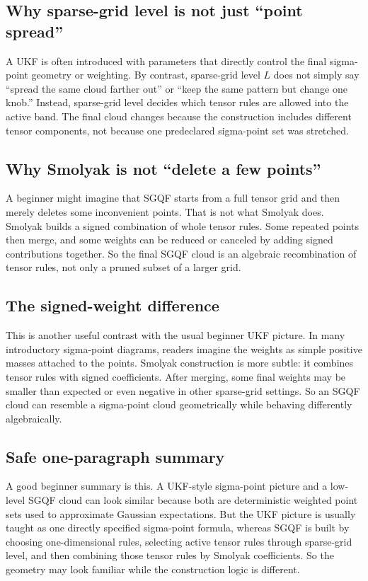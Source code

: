 \documentclass[11pt]{article}
\begin{document}
\subsection{Why sparse-grid level is not just ``point spread''}

A UKF is often introduced with parameters that directly control the final
sigma-point geometry or weighting.  By contrast, sparse-grid level \(L\) does not
simply say ``spread the same cloud farther out'' or ``keep the same pattern but
change one knob.''  Instead, sparse-grid level decides which tensor rules are
allowed into the active band.  The final cloud changes because the construction
includes different tensor components, not because one predeclared sigma-point set
was stretched.

\subsection{Why Smolyak is not ``delete a few points''}

A beginner might imagine that SGQF starts from a full tensor grid and then merely
deletes some inconvenient points.  That is not what Smolyak does.  Smolyak builds
a signed combination of whole tensor rules.  Some repeated points then merge, and
some weights can be reduced or canceled by adding signed contributions together.
So the final SGQF cloud is an algebraic recombination of tensor rules, not only a
pruned subset of a larger grid.

\subsection{The signed-weight difference}

This is another useful contrast with the usual beginner UKF picture.  In many
introductory sigma-point diagrams, readers imagine the weights as simple positive
masses attached to the points.  Smolyak construction is more subtle: it combines
tensor rules with signed coefficients.  After merging, some final weights may be
smaller than expected or even negative in other sparse-grid settings.  So an SGQF
cloud can resemble a sigma-point cloud geometrically while behaving differently
algebraically.

\subsection{Safe one-paragraph summary}

A good beginner summary is this.  A UKF-style sigma-point picture and a low-level
SGQF cloud can look similar because both are deterministic weighted point sets
used to approximate Gaussian expectations.  But the UKF picture is usually taught
as one directly specified sigma-point formula, whereas SGQF is built by choosing
one-dimensional rules, selecting active tensor rules through sparse-grid level,
and then combining those tensor rules by Smolyak coefficients.  So the geometry
may look familiar while the construction logic is different.
\end{document}
